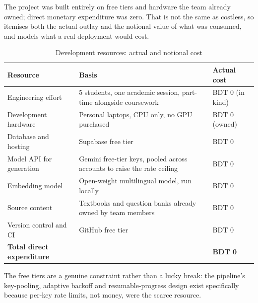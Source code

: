 The project was built entirely on free tiers and hardware the team already
owned; direct monetary expenditure was zero. That is not the same as costless,
so  itemises both the actual outlay and the notional value of
what was consumed, and  models what a real deployment would cost.

\begin{table}[htbp]
  \centering
  \caption{Development resources: actual and notional cost}
  \label{tab:budget}
  \begin{tabularx}{\textwidth}{YY>{\raggedleft\arraybackslash}p{0.18\textwidth}}
    \toprule
    Resource & Basis & Actual cost \\
    \midrule
    Engineering effort & 5 students, one academic session, part-time alongside coursework & BDT 0 (in kind) \\
    Development hardware & Personal laptops, CPU only, no GPU purchased & BDT 0 (owned) \\
    Database and hosting & Supabase free tier & BDT 0 \\
    Model API for generation & Gemini free-tier keys, pooled across accounts to raise the rate ceiling & BDT 0 \\
    Embedding model & Open-weight multilingual model, run locally & BDT 0 \\
    Source content & Textbooks and question banks already owned by team members & BDT 0 \\
    Version control and CI & GitHub free tier & BDT 0 \\
    \midrule
    \textbf{Total direct expenditure} & & \textbf{BDT 0} \\
    \bottomrule
  \end{tabularx}
\end{table}

The free tiers are a genuine constraint rather than a lucky break: the pipeline's
key-pooling, adaptive backoff and resumable-progress design exist specifically
because per-key rate limits, not money, were the scarce resource.

